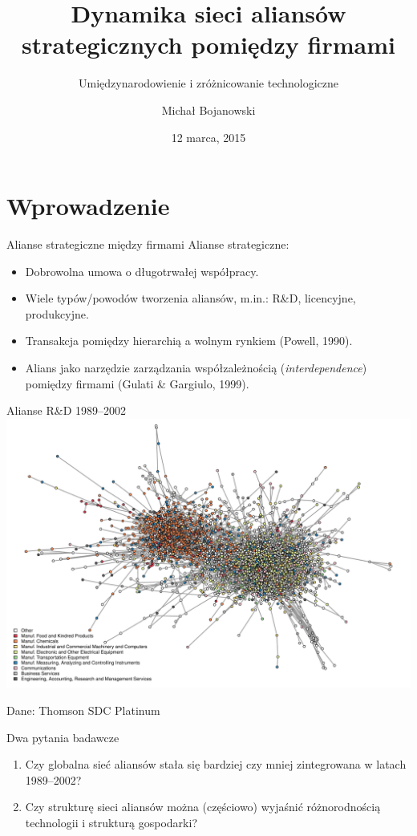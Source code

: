 \documentclass{beamer}
\title{Dynamika sieci aliansów strategicznych pomiędzy firmami}
\subtitle{Umiędzynarodowienie i zróżnicowanie technologiczne}
\author[Michał Bojanowski <m.bojanowski@uw.edu.pl>]{Michał Bojanowski\\ \email{m.bojanowski@uw.edu.pl}}
\date{12 marca, 2015}
\institute{ICM UW}
\begin{document}
\begin{frame}
	\titlepage
\end{frame}

\section{Wprowadzenie}

\begin{frame}{Alianse strategiczne między firmami}
	Alianse strategiczne:
	\begin{itemize}
		\item Dobrowolna umowa o długotrwałej współpracy.
		\item Wiele typów/powodów tworzenia aliansów, m.in.: R\&D, licencyjne, produkcyjne.
		\item Transakcja pomiędzy hierarchią a wolnym rynkiem (Powell, 1990).
		\item Alians jako narzędzie zarządzania współzależnością
			(\textit{interdependence}) pomiędzy firmami (Gulati \& Gargiulo, 1999).
	\end{itemize}
\end{frame}

\begin{frame}{Alianse R\&D 1989--2002}
	\centering\includegraphics[width=\textwidth]{thomson-sec2}

	\begin{footnotesize}
		Dane: Thomson SDC Platinum
	\end{footnotesize}
\end{frame}



\begin{frame}{Dwa pytania badawcze}
	\begin{enumerate}
		\item Czy globalna sieć aliansów stała się bardziej czy mniej zintegrowana
			w latach 1989--2002?
		\item Czy strukturę sieci aliansów można (częściowo) wyjaśnić
			różnorodnością technologii i strukturą gospodarki?
	\end{enumerate}
\end{frame}
\end{document}
